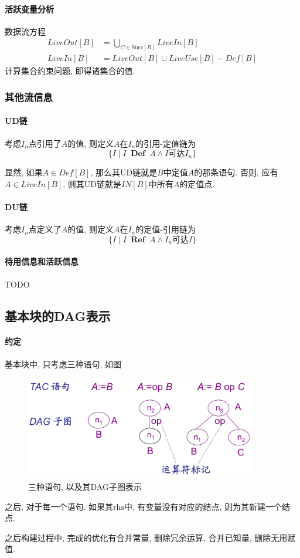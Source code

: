 \documentclass{ctexart}
\DeclareMathOperator{\Def}{\;\mathbf{Def}\;}
\DeclareMathOperator{\Ref}{\;\mathbf{Ref}\;}
\begin{document}
\paragraph{活跃变量分析}
    数据流方程
    \begin{align*}
        LiveOut[B] &= \bigcup_{C \in \mathrm{Succ}[B]} LiveIn[B]\\
        LiveIn[B] &= LiveOut[B] \cup LiveUse[B] - Def[B]
    \end{align*}
    计算集合约束问题, 即得诸集合的值.

\subsubsection{其他流信息}
\paragraph{UD链} 考虑$I_n$点引用了$A$的值, 则定义$A$在$I_n$的引用-定值链为
    \[\{ I \;|\; I \Def A \land I \text{可达} I_n\}\]\par
    显然, 如果$A \in Def[B]$, 那么其UD链就是$B$中定值$A$的那条语句.
    否则, 应有$A \in LiveIn[B]$, 则其UD链就是$IN[B]$中所有$A$的定值点.
\paragraph{DU链} 考虑$I_n$点定义了$A$的值, 则定义$A$在$I_n$的定值-引用链为
    \[\{ I \;|\; I \Ref A \land I_n \text{可达} I\}\]\par
\paragraph{待用信息和活跃信息}
    TODO

\subsection{基本块的DAG表示}
\paragraph{约定} 基本块中, 只考虑三种语句, 如图
    \begin{figure}[ht]
    \centering
    \includegraphics[width=0.9\textwidth]{bb-dag.png}
    \caption{三种语句, 以及其DAG子图表示}
    \label{bb-dag}
    \end{figure}
    之后, 对于每一个语句. 如果其$\mathrm{rhs}$中, 
    有变量没有对应的结点, 则为其新建一个结点.\par
    之后构建过程中, 完成的优化有合并常量,
    删除冗余运算, 合并已知量, 删除无用赋值.
\end{document}
